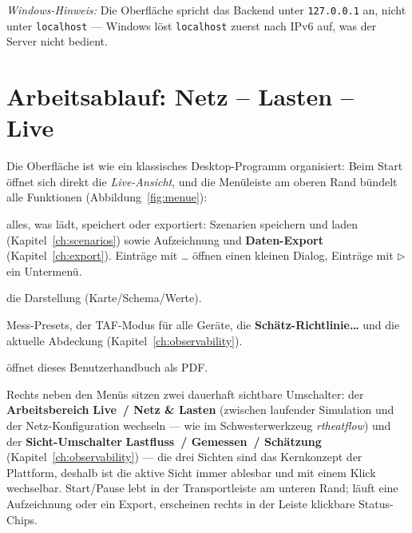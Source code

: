 \documentclass[11pt,a4paper,parskip=half]{scrreprt}
\newcommand{\ui}[1]{\textsf{\bfseries #1}}          %
\begin{document}
\emph{Windows-Hinweis:} Die Oberfläche spricht das Backend unter
\texttt{127.0.0.1} an, nicht unter \texttt{localhost} --- Windows löst
\texttt{localhost} zuerst nach IPv6 auf, was der Server nicht bedient.

\chapter{Arbeitsablauf: Netz -- Lasten -- Live}

Die Oberfläche ist wie ein klassisches Desktop-Programm organisiert:
Beim Start öffnet sich direkt die \emph{Live-Ansicht}, und die
Menüleiste am oberen Rand bündelt alle Funktionen
(Abbildung~\ref{fig:menue}):

\begin{description}[nosep]
  \item[\ui{Datei}] alles, was lädt, speichert oder exportiert:
    Szenarien speichern und laden (Kapitel~\ref{ch:scenarios})
    sowie Aufzeichnung und \ui{Daten-Export}
    (Kapitel~\ref{ch:export}). Einträge mit \glqq…\grqq{} öffnen
    einen kleinen Dialog, Einträge mit
    \glqq$\triangleright$\grqq{} ein Untermenü.
  \item[\ui{Ansicht}] die Darstellung (Karte/Schema/Werte).
  \item[\ui{Messungen}] Mess-Presets, der TAF-Modus für alle
    Geräte, die \ui{Schätz-Richtlinie…} und die aktuelle Abdeckung
    (Kapitel~\ref{ch:observability}).
  \item[\ui{Hilfe}] öffnet dieses Benutzerhandbuch als PDF.
\end{description}

Rechts neben den Menüs sitzen zwei dauerhaft sichtbare
Umschalter: der \textbf{Arbeitsbereich} \ui{Live~/ Netz \& Lasten}
(zwischen laufender Simulation und der Netz-Konfiguration wechseln
--- wie im Schwesterwerkzeug \emph{rtheatflow}) und der
\textbf{Sicht-Umschalter} \ui{Lastfluss~/ Gemessen~/ Schätzung}
(Kapitel~\ref{ch:observability}) --- die drei Sichten sind das
Kernkonzept der Plattform, deshalb ist die aktive Sicht immer
ablesbar und mit einem Klick wechselbar. Start/Pause lebt in der
Transportleiste am unteren Rand; läuft eine Aufzeichnung oder ein
Export, erscheinen rechts in der Leiste klickbare Status-Chips.
\end{document}
